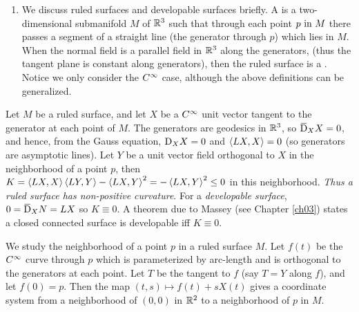 \documentclass[../main]{subfiles}
\begin{document}
\begin{enumerate}
    These expressions can be derived as follows. Let $X$ be the unit tangent field to a circle of radius $r$ about the origin in $\bR^2$ (see Figure \ref{fig:ch02fig4}) so $f(t) = (r\cos(t/r),r\sin(t/r))$ parameterizes the circle to fit $X$. Then evaluating a unit outer normal $N$ on $f(t)$ gives $N\circ f(t) = (\cos(t/r),\sin(t/r))$. Hence, \[\dv{}{t}(N\circ f(t))= \dfrac{1}{r}X,\] or if the circle lies on the surface then we see $\covariant_XN = L(X) = \dfrac{1}{r}X$. Now apply this to the circles on the torus. \label{enu:CH02S05.5}
    \item We discuss ruled surfaces and developable surfaces briefly. A  is a two-dimensional submanifold $M$ of $\mathbb{R}^3$ such that through each point $p\text{ in } M$ there passes a segment of a straight line (the generator through $p$) which lies in $M$. When the normal field is a parallel field in $\mathbb{R}^3$ along the generators, (thus the tangent plane is constant along generators), then the ruled surface is a . Notice we only consider the $C^\infty$ case, although the above definitions can be generalized. \label{enu:CH02S05.6}
\end{enumerate}

Let $M$ be a ruled surface, and let $X$ be a $C^\infty$ unit vector tangent to the generator at each point of $M$. The generators are geodesics in $\mathbb{R}^3$, so $\covariant_XX = 0$, and hence, from the Gauss equation, $\mathrm{D}_XX = 0$ and $\left\langle LX,X\right\rangle = 0$ (so generators are asymptotic lines). Let $Y$ be a unit vector field orthogonal to $X$ in the neighborhood of a point $p$, then $K = \left\langle LX,X\right\rangle \left\langle LY,Y\right\rangle - \left\langle LX,Y\right\rangle^{2} = -\left\langle LX,Y\right\rangle^{2}\le 0$ in this neighborhood. \emph{Thus a ruled surface has non-positive curvature}. For a \emph{developable surface}, $0 = \covariant_XN = LX$ so $K \equiv 0$. A theorem due to Massey (see Chapter \ref{ch03}) states a closed connected surface is developable iff $K \equiv 0$.

We study the neighborhood of a point $p$ in a ruled surface $M$. Let $f(t)$ be the $C^\infty$ curve through $p$ which is parameterized by arc-length and is orthogonal to the generators at each point. Let $T$ be the tangent to $f$ (say $T = Y$ along $f$), and let $f(0) = p$. Then the map $(t,s)\mapsto f(t)+sX(t)$ gives a coordinate system from a neighborhood of $(0, 0)$ in $\bR^2$ to a neighborhood of $p$ in $M$. 

\end{document}
